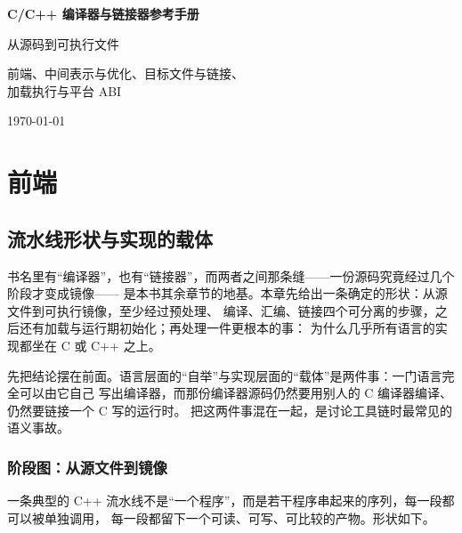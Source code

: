 \documentclass[12pt,a4paper,fontset=fandol]{ctexbook}
\newcommand{\Lang}[1]{\textsf{#1}}
\newcommand{\CL}{\Lang{C}}
\newcommand{\CPP}{\Lang{C++}}
\begin{document}
\frontmatter

\begin{titlepage}
\centering
\vspace*{4cm}
{\Huge\bfseries C/C++ 编译器与链接器参考手册\par}
\vspace{1cm}
{\LARGE 从源码到可执行文件\par}
\vspace{0.4cm}
{\Large 前端、中间表示与优化、目标文件与链接、\\ 加载执行与平台 ABI\par}
\vfill
{\large \today\par}
\end{titlepage}

\tableofcontents

\mainmatter

\cleardoublepage

\part{前端}
\chapter{流水线形状与实现的载体}\label{ch:cl01-pipeline}

书名里有“编译器”，也有“链接器”，而两者之间那条缝——一份源码究竟经过几个阶段才变成镜像——
是本书其余章节的地基。本章先给出一条确定的形状：从源文件到可执行镜像，至少经过预处理、
编译、汇编、链接四个可分离的步骤，之后还有加载与运行期初始化；再处理一件更根本的事：
为什么几乎所有语言的实现都坐在 \CL{} 或 \CPP{} 之上。

先把结论摆在前面。语言层面的“自举”与实现层面的“载体”是两件事：一门语言完全可以由它自己
写出编译器，而那份编译器源码仍然要用别人的 \CL{} 编译器编译、仍然要链接一个 \CL{} 写的运行时。
把这两件事混在一起，是讨论工具链时最常见的语义事故。

\section{阶段图：从源文件到镜像}\label{sec:cl01-stages}

一条典型的 \CPP{} 流水线不是“一个程序”，而是若干程序串起来的序列，每一段都可以被单独调用，
每一段都留下一个可读、可写、可比较的产物。形状如下。
\end{document}
